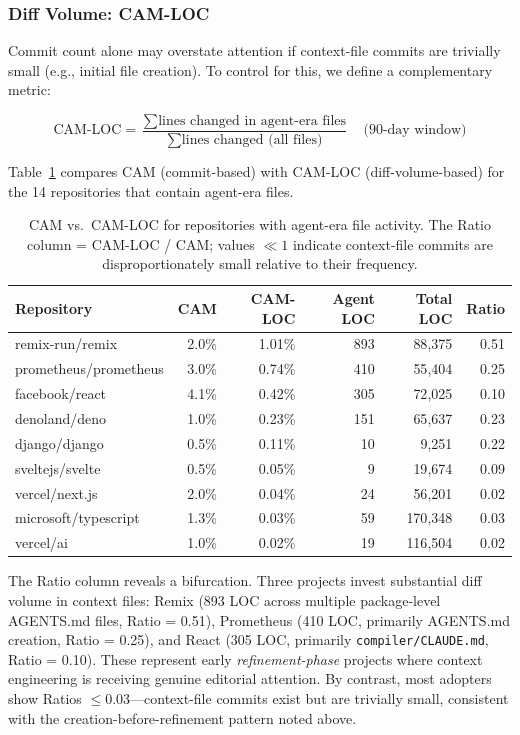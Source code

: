 \documentclass[sigconf, nonacm, anonymous=false]{acmart}
\begin{document}
\subsubsection{Diff Volume: CAM-LOC}

Commit count alone may overstate attention if context-file commits are trivially small (e.g., initial file creation). To control for this, we define a complementary metric:

\begin{equation}
\text{CAM-LOC} = \frac{\sum \text{lines changed in agent-era files}}{\sum \text{lines changed (all files)}} \quad \text{(90-day window)}
\end{equation}

\noindent Table~\ref{tab:cam-loc} compares CAM (commit-based) with CAM-LOC (diff-volume-based) for the 14 repositories that contain agent-era files.

\begin{table}[ht]
\centering
\small
\begin{tabularx}{\textwidth}{lrrrrr}
\toprule
\textbf{Repository} & \textbf{CAM} & \textbf{CAM-LOC} & \textbf{Agent LOC} & \textbf{Total LOC} & \textbf{Ratio} \\
\midrule
remix-run/remix & 2.0\% & 1.01\% & 893 & 88{,}375 & 0.51 \\
prometheus/prometheus & 3.0\% & 0.74\% & 410 & 55{,}404 & 0.25 \\
facebook/react & 4.1\% & 0.42\% & 305 & 72{,}025 & 0.10 \\
denoland/deno & 1.0\% & 0.23\% & 151 & 65{,}637 & 0.23 \\
django/django & 0.5\% & 0.11\% & 10 & 9{,}251 & 0.22 \\
sveltejs/svelte & 0.5\% & 0.05\% & 9 & 19{,}674 & 0.09 \\
vercel/next.js & 2.0\% & 0.04\% & 24 & 56{,}201 & 0.02 \\
microsoft/typescript & 1.3\% & 0.03\% & 59 & 170{,}348 & 0.03 \\
vercel/ai & 1.0\% & 0.02\% & 19 & 116{,}504 & 0.02 \\
\bottomrule
\end{tabularx}
\caption{CAM vs.\ CAM-LOC for repositories with agent-era file activity. The Ratio column = CAM-LOC / CAM; values $\ll 1$ indicate context-file commits are disproportionately small relative to their frequency.}
\label{tab:cam-loc}
\end{table}

The Ratio column reveals a bifurcation. Three projects invest substantial diff volume in context files: Remix (893 LOC across multiple package-level AGENTS.md files, Ratio = 0.51), Prometheus (410 LOC, primarily AGENTS.md creation, Ratio = 0.25), and React (305 LOC, primarily \texttt{compiler/CLAUDE.md}, Ratio = 0.10). These represent early \textit{refinement-phase} projects where context engineering is receiving genuine editorial attention. By contrast, most adopters show Ratios $\leq 0.03$---context-file commits exist but are trivially small, consistent with the creation-before-refinement pattern noted above.
\end{document}
